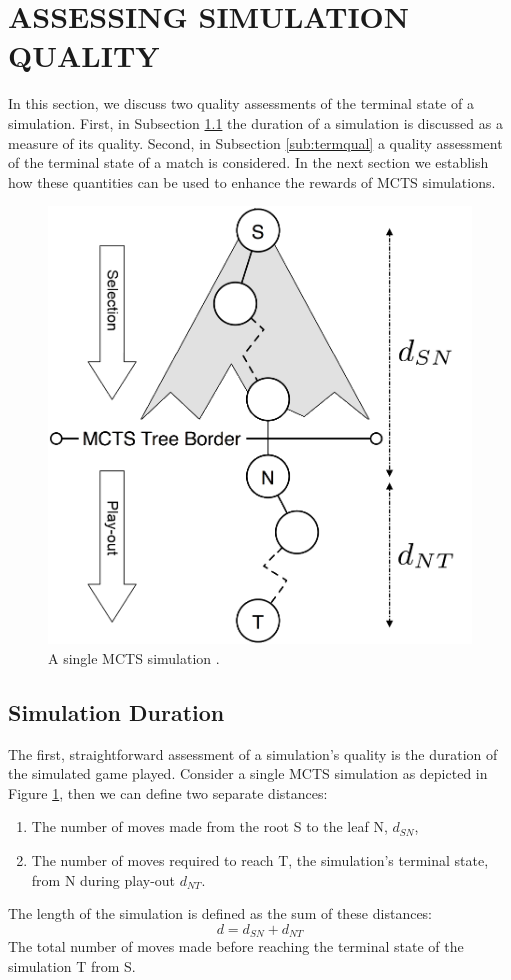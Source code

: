 \documentclass{ecai2014}
\newcommand{\node}[1]{{\fontfamily{phv}\selectfont#1}}
\begin{document}
\section{ASSESSING SIMULATION QUALITY}
\label{sec:poqual}
In this section, we discuss two quality assessments of the terminal state of a simulation. First, in Subsection \ref{sub:simdur} the duration of a simulation is discussed as a measure of its quality. Second, in Subsection \ref{sub:termqual} a quality assessment of the terminal state of a match is considered. In the next section we establish how these quantities can be used to enhance the rewards of MCTS simulations. 
\begin{figure}[t]
	\centering
	\includegraphics[width=.27\textwidth]{img/figure2_new.png}
	\caption{A single MCTS simulation \cite{finnsson2012generalized}.}
	\label{fig:mcts-simulation}
\end{figure}
\subsection{Simulation Duration} 
\label{sub:simdur}
The first, straightforward assessment of a simulation's quality is the duration of the simulated game played. Consider a single MCTS simulation as depicted in Figure \ref{fig:mcts-simulation}, then we can define two separate distances: 
\begin{enumerate}
\item The number of moves made from the root \node{S} to the leaf \node{N}, $d_{SN}$,
\item The number of moves required to reach \node{T}, the simulation's terminal state, from \node{N} during play-out $d_{NT}$.
\end{enumerate}
The length of the simulation is defined as the sum of these distances:
\begin{equation}
d = d_{SN} + d_{NT}
\label{eq:m_ST}
\end{equation}
The total number of moves made before reaching the terminal state of the simulation \node{T} from \node{S}.
\end{document}
